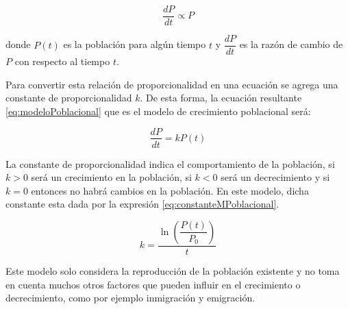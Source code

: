 \begin{equation}
	\dfrac{dP}{dt} \propto P
	\label{eq:proporcionPoblacional}
\end{equation}

donde $P(t)$ es la población para algún tiempo $t$ y $\dfrac{dP}{dt}$ es la razón de cambio de $P$ con respecto al tiempo $t$.

Para convertir esta relación de proporcionalidad en una ecuación se agrega una constante de proporcionalidad $k$. De esta forma, la ecuación 
resultante \ref{eq:modeloPoblacional} que es el modelo de crecimiento poblacional será:

\begin{equation}
	\dfrac{dP}{dt} = kP(t)
	\label{eq:modeloPoblacional}
\end{equation}

La constante de proporcionalidad indica el comportamiento de la población, si $k>0$ será un crecimiento en la población, si $k<0$ será un 
decrecimiento y si $k=0$ entonces no habrá cambios en la población. En este modelo, dicha constante esta dada por la expresión 
\ref{eq:constanteMPoblacional}.

\begin{equation}
	k = \frac{\ln \left(\dfrac{P(t)}{P_0} \right)}{t}
	\label{eq:constanteMPoblacional}
\end{equation}

Este modelo solo considera la reproducción de la población existente y no toma en cuenta  muchos otros factores que pueden influir en el 
crecimiento o decrecimiento, como por ejemplo inmigración y emigración. 


